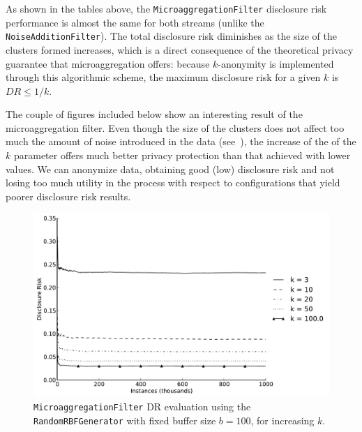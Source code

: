 As shown in the tables above, the \texttt{MicroaggregationFilter} disclosure risk performance is almost the same for both streams (unlike the \texttt{NoiseAdditionFilter}). The total disclosure risk diminishes as the size of the clusters formed increases, which is a direct consequence of the theoretical privacy guarantee that microaggregation offers: because $k$-anonymity is implemented through this algorithmic scheme, the maximum disclosure risk for a given $k$ is $DR \leq 1/k$.

The couple of figures included below show an interesting result of the microaggregation filter. Even though the size of the clusters does not affect too much the amount of noise introduced in the data (see~), the increase of the of the $k$ parameter offers much better privacy protection than that achieved with lower values. We can anonymize data, obtaining good (low) disclosure risk and not losing too much utility in the process with respect to configurations that yield poorer disclosure risk results.

\begin{figure}[h]
	\centering
	\includegraphics[width=0.9\linewidth]{figures/dr_ma-random.pdf}
	\caption[Microaggregation DR evaluation ($b = 100$).]{\texttt{MicroaggregationFilter} DR evaluation using the \texttt{RandomRBFGenerator} with fixed buffer size $b = 100$, for increasing $k$.}
	\label{fig:results-dr-ma}
\end{figure}

